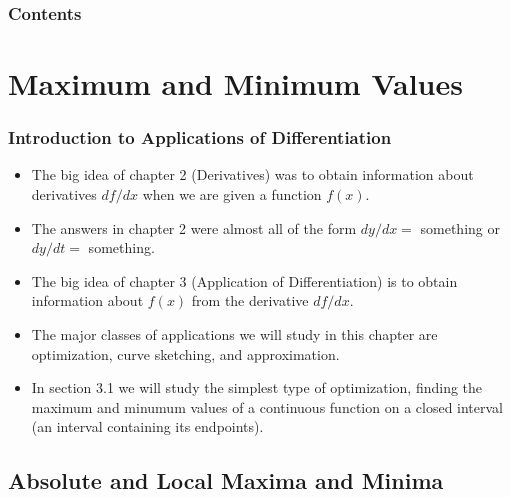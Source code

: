 \documentclass[serif,ignorenonframetext]{beamer}
\title{\commonTitleZeroThreeOne}
\subtitle{\commonSubtitleZeroThreeOne}
\author{\commonAuthor}
\institute{\commonInstitute}
\date{\commonDateZeroThreeOne}
\begin{document}

\begin{frame}
  \titlepage
\end{frame}

\begin{frame}
  \frametitle{Contents}
  \tableofcontents
\end{frame}

%  

\section{Maximum and Minimum Values}

\begin{frame}
  \frametitle{Introduction to Applications of Differentiation}
  \begin{itemize}[<+->]
  \item The big idea of chapter 2 (Derivatives) was to obtain information
    about derivatives $df/dx$ when we are given a function $f(x)$.
  \item The answers in chapter 2 were almost all of the form $dy/dx=$
    something or $dy/dt=$ something.
  \item The big idea of chapter 3 (Application of Differentiation) is to
    obtain information about $f(x)$ from the derivative $df/dx$.
  \item The major classes of applications we will study in this chapter
    are optimization, curve sketching, and approximation.
  \item In section 3.1 we will study the simplest type of optimization,
    finding the maximum and minumum values of a continuous function on
    a closed interval (an interval containing its endpoints).
  \end{itemize}
\end{frame}

\subsection{Absolute and Local Maxima and Minima}
\end{document}
